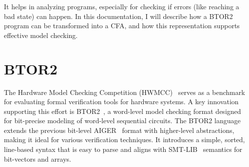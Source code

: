 It helps in analyzing programs, especially for checking if errors (like reaching a bad state) can happen. In this documentation, I will describe how a BTOR2 program can be transformed into a CFA, and how this representation supports effective model checking.

\section{ BTOR2 }



The Hardware Model Checking Competition (HWMCC)~\cite{hwmcc} serves as a benchmark for evaluating formal verification tools for hardware systems. A key innovation supporting this effort is BTOR2~\cite{btor2}, a word-level model checking format designed for bit-precise modeling of word-level sequential circuits.
The BTOR2 language extends the previous bit-level AIGER~\cite{AIGER} format with higher-level abstractions, making it ideal for various verification techniques. It introduces a simple, sorted, line-based syntax that is easy to parse and aligns with SMT-LIB~\cite{SMT-LIB} semantics for bit-vectors and arrays.



